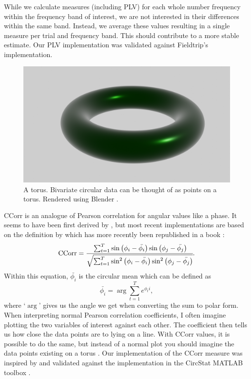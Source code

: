 While we calculate measures (including PLV) for each whole number frequency
within the frequency band of interest, we are not interested in their
differences within the same band. Instead, we average these values resulting
in a single measure per trial and frequency band. This should contribute to a
more stable estimate. Our PLV implementation was validated against Fieldtrip's
implementation.

\begin{figure}[!htpb]
  \includegraphics[width=\linewidth]{torus.png}
  \caption{A torus. Bivariate circular data can be thought of as points on a torus. Rendered using Blender \parencite{blender_online_community_blender_2022}.}
  \label{fig:torus}
\end{figure}

CCorr is an analogue of Pearson correlation for angular values
like a phase. It seems to have been first derived by
\textcite{fisher_correlation_1983}, but most recent implementations are based on
the definition by \textcite{jammalamadaka_correlation_1988} which has more
recently been republished in a book \parencite{jammalamadaka_topics_2001}:
\begin{equation}\label{eq:ccorr}
\text{CCorr} = \cfrac{\sum_{t = 1}^T \sin\left(\phi_i - \bar{\phi_i}\right) \sin\left(\phi_j - \bar{\phi_j}\right)}
                {\sqrt{\sum_{t = 1}^T \sin^2\left(\phi_i - \bar{\phi_i}\right) \sin^2\left(\phi_j - \bar{\phi_j}\right)}}.
\end{equation}
Within this equation, $\bar{\phi_i}$ is the circular mean which can be
defined as
\begin{equation}
\bar{\phi_i} = \operatorname{arg} \sum_{t=1}^T e^{\phi_ti},
\end{equation}
where `$\operatorname{arg}$' gives us the angle we get when converting the sum
to polar form. When interpreting normal Pearson correlation coefficients, I
often imagine plotting the two variables of interest against each other. The
coefficient then tells us how close the data points are to lying on a line. With
CCorr values, it is possible to do the same, but instead of a normal
plot you should imagine the data points existing on a torus
\parencite[see also Figure~\ref{fig:torus}]{lee_circular_2010}. Our
implementation of the CCorr measure was inspired by and validated against
the implementation in the CircStat MATLAB toolbox
\parencite{berens_circstat_2009}.

